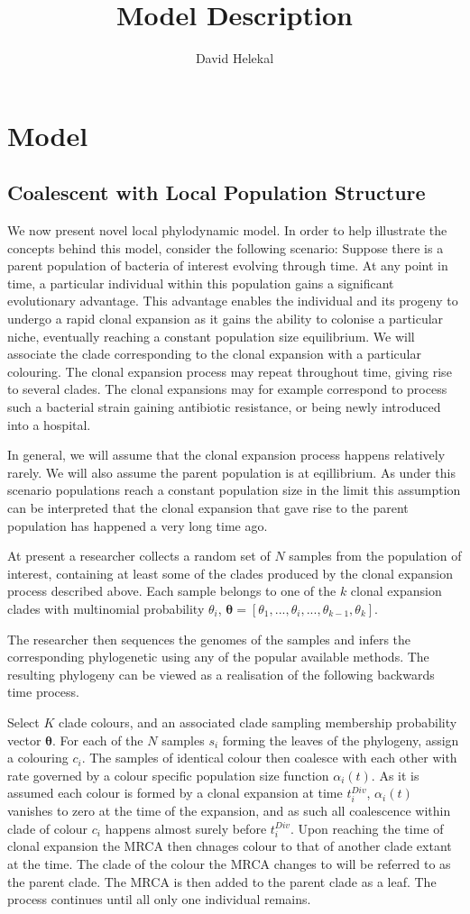 \documentclass{report}
\title{Model Description}
\author{David Helekal}
\theoremstyle{definition}
\begin{document}
\chapter{Model}
\section{Coalescent with Local Population Structure}
We now present novel local phylodynamic model.
In order to help illustrate the concepts behind this model, consider the following scenario:
Suppose there is a parent population of bacteria of interest evolving through time. At any point in time, a particular individual within this population gains a significant evolutionary advantage. This advantage enables the individual and its progeny to undergo a rapid clonal expansion as it gains the ability to colonise a particular niche, eventually reaching a constant population size equilibrium. We will associate the clade corresponding to the clonal expansion with a particular colouring. 
The clonal expansion process may repeat throughout time, giving rise to several clades. The clonal expansions may for example correspond to process such a bacterial strain gaining antibiotic resistance, or being newly introduced into a hospital.

In general, we will assume that the clonal expansion process happens relatively rarely. We will also assume the parent population is at eqillibrium. As under this scenario populations reach a constant population size in the limit this assumption can be interpreted that the clonal expansion that gave rise to the parent population has happened a very long time ago.

At present a researcher collects a random set of $N$ samples from the population of interest, containing at least some of the clades produced by the clonal expansion process described above. Each sample belongs to one of the $k$ clonal expansion clades with multinomial probability $\theta_i$, $\pmb{\theta} = [\theta_1, ..., \theta_i, ..., \theta_{k-1}, \theta_{k}]$.

The researcher then sequences the genomes of the samples and infers the corresponding phylogenetic using any of the popular available methods.
The resulting phylogeny can be viewed as a realisation of the following backwards time process. 

Select $K$ clade colours, and an associated clade sampling membership probability vector $\pmb{\theta}$. For each of the $N$ samples $s_i$ forming the leaves of the phylogeny, assign a colouring $c_i$. The samples of identical colour then coalesce with each other with rate governed by a colour specific population size function $\alpha_i(t)$. As it is assumed each colour is formed by a clonal expansion at time $t^{Div}_{i}$, $\alpha_i(t)$ vanishes to zero at the time of the expansion, and as such all coalescence within clade of colour $c_i$ happens almost surely before $t^{Div}_{i}$. Upon reaching the time of clonal expansion the MRCA then chnages colour to that of another clade extant at the time. The clade of the colour the MRCA changes to will be referred to as the parent clade. The MRCA is then added to the parent clade as a leaf. 
The process continues until all only one individual remains.
\end{document}
